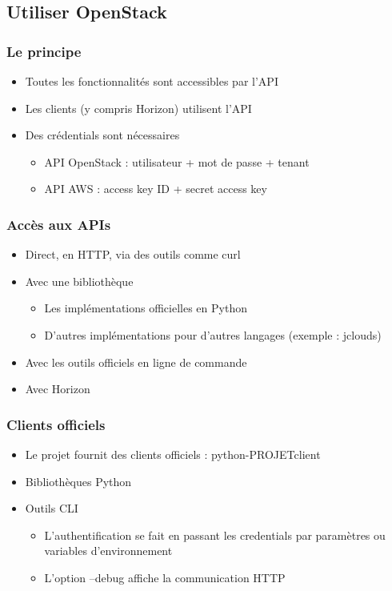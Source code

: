   \subsection[Utilisation]{Utiliser OpenStack}

  \begin{frame}
    \frametitle{Le principe}
    \begin{itemize}
      \item Toutes les fonctionnalités sont accessibles par l'API
      \item Les clients (y compris Horizon) utilisent l'API
      \item Des crédentials sont nécessaires
      \begin{itemize}
        \item API OpenStack : utilisateur + mot de passe + tenant
        \item API AWS : access key ID + secret access key
      \end{itemize}
    \end{itemize}
  \end{frame}

  \begin{frame}
    \frametitle{Accès aux APIs}
    \begin{itemize}
      \item Direct, en HTTP, via des outils comme curl
      \item Avec une bibliothèque
      \begin{itemize}
        \item Les implémentations officielles en Python
        \item D'autres implémentations pour d'autres langages (exemple : jclouds)
      \end{itemize}
      \item Avec les outils officiels en ligne de commande
      \item Avec Horizon
    \end{itemize}
  \end{frame}

  \begin{frame}
    \frametitle{Clients officiels}
    \begin{itemize}
      \item Le projet fournit des clients officiels : python-PROJETclient
      \item Bibliothèques Python
      \item Outils CLI
      \begin{itemize}
        \item L'authentification se fait en passant les credentials par paramètres ou variables d'environnement
        \item L'option --debug affiche la communication HTTP
      \end{itemize}
    \end{itemize}
  \end{frame}

